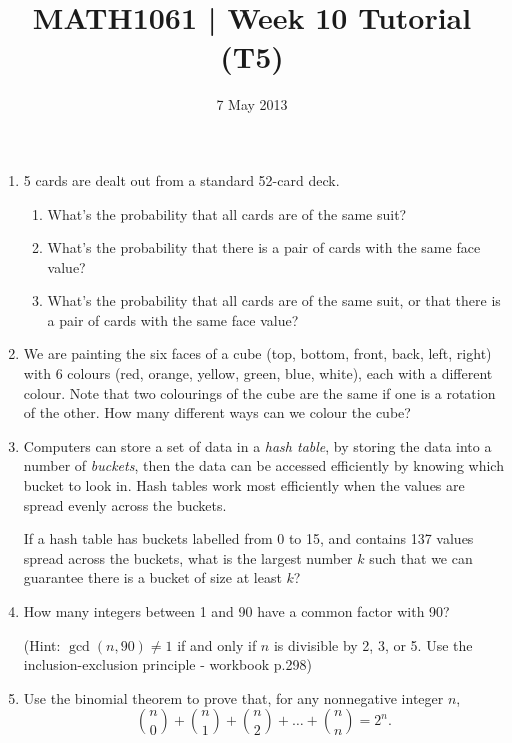 \documentclass[a4paper,12pt]{article}
\begin{document}
\pagestyle{myheadings}

\title{MATH1061 | Week 10 Tutorial (T5)}
\date{7 May 2013}
\maketitle

\begin{enumerate}
\item
    5 cards are dealt out from a standard 52-card deck.
    \begin{enumerate}
    \item
    What's the probability that all cards are of the same suit?
    \item
    What's the probability that there is a pair of cards with the same face value?
    \item
    What's the probability that all cards are of the same suit, or that there is
    a pair of cards with the same face value?
    \end{enumerate}
\item
    We are painting the six faces of a cube (top, bottom, front, back, left,
    right) with 6 colours (red, orange, yellow, green, blue, white), each with
    a different colour. Note that two colourings of the cube are the same if
    one is a rotation of the other. How many different ways can we colour the
    cube?
\item
    Computers can store a set of data in a {\em hash table}, by storing the data
    into a number of {\em buckets}, then the data can be accessed efficiently by
    knowing which bucket to look in. Hash tables work most efficiently when the
    values are spread evenly across the buckets.

    If a hash table has buckets labelled from 0 to 15, and contains 137 values
    spread across the buckets, what is the largest number $k$ such that we can
    guarantee there is a bucket of size at least $k$?
\item
    How many integers between 1 and 90 have a common factor with 90?

    (Hint: $\gcd(n, 90) \neq 1$ if and only if $n$ is divisible by 2, 3, or 5.
    Use the inclusion-exclusion principle - workbook p.298)
\item
    Use the binomial theorem to prove that, for any nonnegative integer $n$,
    \[
        {n \choose 0} + {n \choose 1} + {n \choose 2} + \dots + {n \choose n} = 2^n.
    \]
\end{enumerate}
\end{document}
